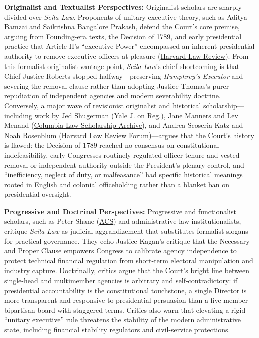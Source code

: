 \documentclass[12pt]{article}
\begin{document}
\textbf{Originalist and Textualist Perspectives:} Originalist scholars are sharply divided over \textit{Seila Law}. Proponents of unitary executive theory, such as Aditya Bamzai and Saikrishna Bangalore Prakash, defend the Court's core premise, arguing from Founding-era texts, the Decision of 1789, and early presidential practice that Article II's ``executive Power'' encompassed an inherent presidential authority to remove executive officers at pleasure (\href{https://harvardlawreview.org/print/vol-136/the-executive-power-of-removal/}{Harvard Law Review}). From this formalist-originalist vantage point, \textit{Seila Law}'s chief shortcoming is that Chief Justice Roberts stopped halfway---preserving \textit{Humphrey's Executor} and severing the removal clause rather than adopting Justice Thomas's purer repudiation of independent agencies and modern severability doctrine. Conversely, a major wave of revisionist originalist and historical scholarship---including work by Jed Shugerman (\href{https://www.yalejreg.com/nc/a-reply-to-the-unitary-executive-theorists-on-the-misuse-of-historical-materials-by-jed-shugerman/}{Yale J. on Reg.}), Jane Manners and Lev Menand (\href{https://scholarship.law.columbia.edu/faculty_scholarship/3116/}{Columbia Law Scholarship Archive}), and Andrea Scoseria Katz and Noah Rosenblum (\href{https://harvardlawreview.org/forum/vol-136/removal-rehashed/}{Harvard Law Review Forum})---argues that the Court's history is flawed: the Decision of 1789 reached no consensus on constitutional indefeasibility, early Congresses routinely regulated officer tenure and vested removal or independent authority outside the President's plenary control, and ``inefficiency, neglect of duty, or malfeasance'' had specific historical meanings rooted in English and colonial officeholding rather than a blanket ban on presidential oversight.

\textbf{Progressive and Doctrinal Perspectives:} Progressive and functionalist scholars, such as Peter Shane (\href{https://www.acslaw.org/seila-law-lcc-v-cfpb-and-the-persistent-myths-of-presidentialism/}{ACS}) and administrative-law institutionalists, critique \textit{Seila Law} as judicial aggrandizement that substitutes formalist slogans for practical governance. They echo Justice Kagan's critique that the Necessary and Proper Clause empowers Congress to calibrate agency independence to protect technical financial regulation from short-term electoral manipulation and industry capture. Doctrinally, critics argue that the Court's bright line between single-head and multimember agencies is arbitrary and self-contradictory: if presidential accountability is the constitutional touchstone, a single Director is more transparent and responsive to presidential persuasion than a five-member bipartisan board with staggered terms. Critics also warn that elevating a rigid ``unitary executive'' rule threatens the stability of the modern administrative state, including financial stability regulators and civil-service protections.
\end{document}
